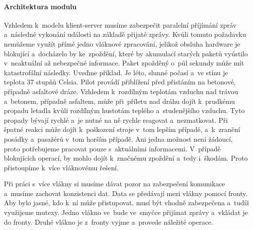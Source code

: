 		\paragraph{Architektura modulu}
		Vzhledem k~modelu klient-server musíme zabezpečit paralelní příjímání zpráv a~následné vykonání události na základě přijaté zprávy. Kvůli tomuto požadavku nemůžeme využít přímé jedno vláknové zpracování, jelikož obsluha hardware je blokující a~docházelo by ke~zpoždění, které by akumulací starých paketů vyústilo v~neaktuální až nebezpečné informace. Paket zpožděný o~půl sekundy může mít katastrofální následky. Uveďme příklad. Je léto, slunné počasí a~ve stínu je teplota 37 stupňů Celsia. Pilot provádí přiblížení před přistáním na betonové, případně asfaltové dráze. Vzhledem k~rozdílným teplotám vzduchu nad trávou a~betonem, případně asfaltem, může při~příletu nad dráhu dojít k~prudkému propadu letadla kvůli rozdílným hustotám teplého a~studenějšího vzduchu. Tyto propady bývají rychlé a~je nutné na ně rychle reagovat a~nezmatkovat. Při špatné reakci může dojít k~poškození stroje v~tom lepším případě, a~k~zranění posádky a~pasažérů v~tom horším případě. Ani jedna možnost není žádoucí, proto potřebujeme pracovat pouze s~aktuálními informacemi. V~případě blokujících operací, by mohlo dojít k~značnému zpoždění a~tedy i~škodám. Proto přistoupíme k~více vláknovému řešení.\par
		Při práci s~více vlákny si musíme dávat pozor na zabezpečení komunikace a~musíme zachovat konzistenci dat. Data se předávají mezi vlákny pomocí fronty. Aby bylo jasné, kdo k~ní může přistupovat, musí být vhodně zabezpečena a~tudíž využijeme mutexy. Jedno vlákno ve~bude ve~smyčce přijímat zprávy a~vkládat je do fronty. Druhé vlákno je z~fronty vyjme a~provede náležité operace.\par
		
